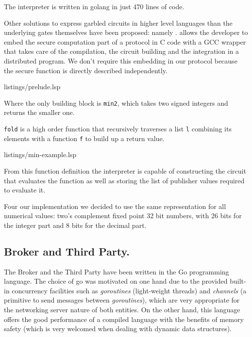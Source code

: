 The interpreter is written in golang in just 470 lines of code.

Other solutions to express garbled circuits in higher level languages than the
underlying gates themselves have been proposed: namely \OblivC{}.  \OblivC{}
allows the developer to embed the secure computation part of a protocol in C
code with a GCC wrapper that takes care of the compilation, the circuit
building and the integration in a distributed program.  We don't require this
embedding in our protocol because the secure function is directly described
independently.

\noindent
\begin{minipage}{\linewidth}

{listings/prelude.lsp}
\end{minipage}

Where the only \libgarble{} building block is \texttt{min2}, which takes two
signed integers and returns the smaller one.

\texttt{fold} is a high order function that recursively traverses a list
\texttt{l} combining its elements with a function \texttt{f} to build up a
return value.

\noindent
\begin{minipage}{\linewidth}

{listings/min-example.lsp}
\end{minipage}

From this function definition the interpreter is capable of constructing the
circuit that evaluates the function as well as storing the list of publisher
values required to evaluate it.

Four our implementation we decided to use the same representation for all
numerical values: two's complement fixed point 32 bit numbers, with 26 bits for
the integer part and 8 bits for the decimal part.

\subsection{Broker and Third Party.}

The Broker and the Third Party have been written in the Go programming
language.  The choice of go was motivated on one hand due to the provided
built-in concurrency facilities such as \emph{goroutines} (light-weight
threads) and \emph{channels} (a primitive to send messages between
\emph{goroutines}), which are very appropriate for the networking server nature
of both entities.  On the other hand, this language offers the good performance
of a compiled language with the benefits of memory safety (which is very
welcomed when dealing with dynamic data structures).

